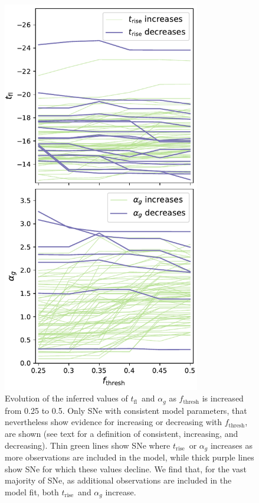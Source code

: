 \documentclass[twocolumn]{./aastex63}
\newcommand{\tfl}{$t_\mathrm{fl}$}
\newcommand{\trise}{$t_\mathrm{rise}$}
\begin{document}
\begin{figure}[ht]
    \centering
    \includegraphics[width=3.4in]{./figures/flux_frac.pdf}
    \caption{Evolution of the inferred values of \tfl\ and $\alpha_g$ as
    $f_\mathrm{thresh}$ is increased from 0.25 to 0.5. Only SNe with
    consistent model parameters, that nevertheless show evidence for
    increasing or decreasing with $f_\mathrm{thresh}$, are shown (see text for
    a definition of consistent, increasing, and decreasing). Thin green lines
    show SNe where \trise\ or $\alpha_g$ increases as more observations are
    included in the model, while thick purple lines show SNe for which these
    values decline. We find that, for the vast majority of SNe, as additional
    observations are included in the model fit, both \trise\ and $\alpha_g$
    increase.}
    \label{fig:flux_frac}
\end{figure}
\end{document}
